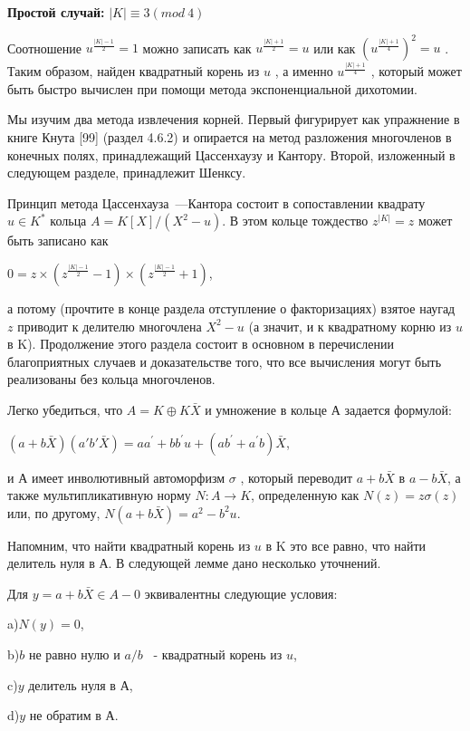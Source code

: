 {\bf Простой случай:} $|K| \equiv 3 (mod \ 4)$

Соотношение $u^{\frac{|K|-1}{2}} = 1$
 можно записать как $u^{\frac{|K|+1}{2}} = u$
 или как $(u^{\frac{|K|+1}{4}})^2 = u$
 . Таким образом, найден квадратный корень из $u$
, а именно $u^{\frac{|K|+1}{4}}$
, который может быть быстро вычислен при помощи метода экспоненциальной дихотомии.


Мы изучим два метода извлечения корней. Первый фигурирует как упражнение в книге Кнута [99] (раздел 4.6.2) и опирается на метод разложения многочленов в конечных полях, принадлежащий Цассенхаузу и Кантору. Второй, изложенный в следующем разделе, принадлежит Шенксу.

\newpage

Принцип метода Цассенхауза~---Кантора состоит в сопоставлении квадрату $u \in K^*$
 кольца $A = K[X]/(X^2 - u)$. В этом кольце тождество $z^{|K|} = z$
 может быть записано как

\begin{center}
$0 = z \times (z^{\frac{|K|-1}{2}} - 1) \times (z^{\frac{|K|-1}{2}} +1)$,
\end{center}


а потому (прочтите в конце раздела отступление о факторизациях) взятое наугад $z$ приводит к делителю многочлена $X^2 - u$
 (а значит, и к квадратному корню из $u$
 в K). Продолжение этого раздела состоит в основном в перечислении благоприятных случаев и доказательстве того, что все вычисления могут быть реализованы без кольца многочленов.

Легко убедиться, что $A = K\oplus K \bar X$
 и умножение в кольце А задается формулой:

\begin{center}
$(a + b \bar X)(a\prime b\prime \bar X) = aa^{\prime} + bb^{\prime} u + (ab^{\prime} + a^{\prime} b) \bar X$,
\end{center}


и А имеет инволютивный автоморфизм $\sigma$
, который переводит $a + b \bar X$
 в $a - b \bar X$, а также мультипликативную норму $N : A \rightarrow K$, определенную как $N(z) = z \sigma (z)$
 или, по другому, $N(a+b \bar X) = a^2 - b^2u$.

Напомним, что найти квадратный корень из $u$
 в K это все равно, что найти делитель нуля в А. В следующей лемме дано несколько уточнений.

\begin{lemma}
Для $y = a+b \bar X \in A - {0}$
 эквивалентны следующие условия:

a)$N(y) = 0$,

b)$b$ не равно нулю и $a/b$
 ~- квадратный корень из $u$,

c)$y$ делитель нуля в А,

d)$y$ не обратим в А.
\end{lemma}

